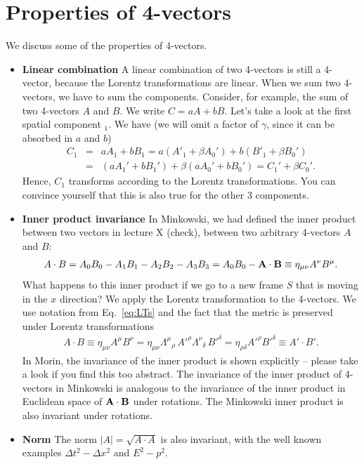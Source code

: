 \documentclass[12pt]{article}
\newcommand{\be}{\begin{eqnarray}}
\newcommand{\ee}{\end{eqnarray}}
\begin{document}
\section{Properties of 4-vectors}\label{sec:properties}

We discuss some of the properties of 4-vectors. 

\begin{itemize}
\item {\bf Linear combination} A linear combination of two 4-vectors is still a 4-vector, because the Lorentz transformations are linear. When we sum two 4-vectors, we have to sum the components. Consider, for example, the sum of two 4-vectors $A$ and $B$. We write $C = aA + bB$. Let's take a look at the first spatial component $_1$. We have (we will omit a factor of $\gamma$, since it can be absorbed in $a$ and $b$)
\be
C_1 &=& aA_1 + bB_1 = a(A'_1 + \beta A_0') + b(B'_1 + \beta B_0') \nonumber \\
&=& (aA_1'+bB_1') + \beta(aA_0'+bB_0') = C_1'+\beta C_0'.
\ee
Hence, $C_1$ transforms according to the Lorentz transformations. You can convince yourself that this is also true for the other 3 components. 

\item {\bf Inner product invariance}
In Minkowski, we had defined the inner product between two vectors in lecture X (check), between two arbitrary 4-vectors $A$ and $B$:
\be
A\cdot B = A_0 B_0 - A_1B_1 - A_2B_2-A_3 B_3 = A_0 B_0 - {\bf A} \cdot {\bf B}\equiv \eta_{\mu \nu} A^{\nu} B^{\mu}.
\ee
What happens to this inner product if we go to a new frame $S$ that is moving in the $x$ direction? We apply the Lorentz transformation to the 4-vectors. We use notation from Eq.~\eqref{eq:LTs} and the fact that the metric is preserved under Lorentz transformations
\be
A\cdot B\equiv \eta_{\mu \nu} A^{\mu} B^{\nu} = \eta_{\mu \nu} \Lambda^{\mu}{}_{\rho} \, A'^{\rho}  \Lambda^{\nu}{}_{\delta} \, B'^{\delta}  = \eta_{\rho \delta} A'^{\rho} B'^{\delta} \equiv A'\cdot B'.
\ee
In Morin, the invariance of the inner product is shown explicitly -- please take a look if you find this too abstract. The invariance of the inner product of 4-vectors in Minkowski is analogous to the invariance of the inner product in Euclidean space of ${\bf A}\cdot {\bf B}$ under rotations. The Minkowski inner product is also invariant under rotations. 

\item {\bf Norm } The norm $|A| = \sqrt{A\cdot A}$ is also invariant, with the well known examples $\Delta t^2 - \Delta x^2$ and $E^2 - p^2$. 


\end{itemize}
\end{document}
